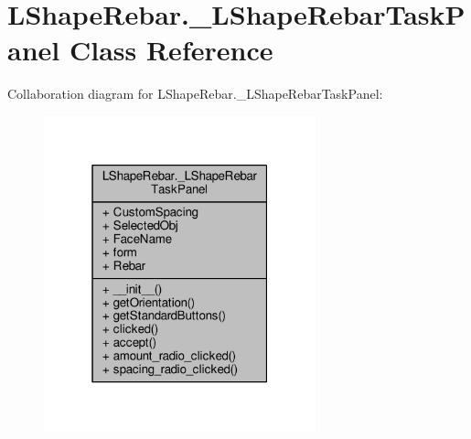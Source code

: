 \hypertarget{classLShapeRebar_1_1__LShapeRebarTaskPanel}{}\section{L\+Shape\+Rebar.\+\_\+\+L\+Shape\+Rebar\+Task\+Panel Class Reference}
\label{classLShapeRebar_1_1__LShapeRebarTaskPanel}


Collaboration diagram for L\+Shape\+Rebar.\+\_\+\+L\+Shape\+Rebar\+Task\+Panel\+:\nopagebreak
\begin{figure}[H]
\begin{center}
\leavevmode
\includegraphics[width=223pt]{classLShapeRebar_1_1__LShapeRebarTaskPanel__coll__graph}
\end{center}
\end{figure}
